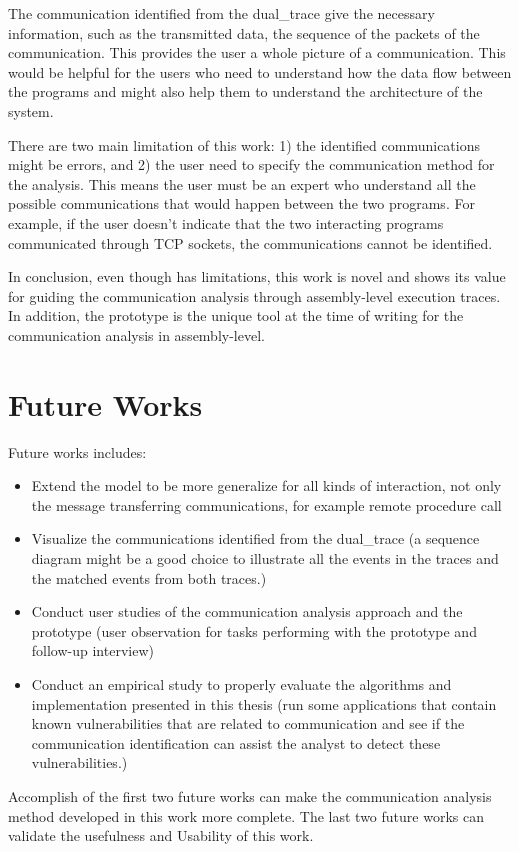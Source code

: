 The communication identified from the dual\_trace give the necessary information, such as the transmitted data, the sequence of the packets of the communication. This provides the user a whole picture of a communication. This would be helpful for the users who need to understand how the data flow between the programs and might also help them to understand the architecture of the system. 

There are two main limitation of this work: 1) the identified communications might be errors, and 2) the user need to specify the communication method for the analysis. This means the user must be an expert who understand all the possible communications that would happen between the two programs. For example, if the user doesn't indicate that the two interacting programs communicated through TCP sockets, the communications cannot be identified. 

In conclusion, even though has limitations, this work is novel and shows its value for guiding the communication analysis through assembly-level execution traces. In addition, the prototype is the unique tool at the time of writing for the communication analysis in assembly-level.

\section{Future Works}

Future works includes:
\begin{itemize}
\item Extend the model to be more generalize for all kinds of interaction, not only the message transferring communications, for example remote procedure call
\item Visualize the communications identified from the dual\_trace (a sequence diagram might be a good choice to illustrate all the events in the traces and the matched events from both traces.) 
\item Conduct user studies of the communication analysis approach and the prototype (user observation for tasks performing with the prototype and follow-up interview)
\item Conduct an empirical study to properly evaluate the algorithms and implementation presented in this thesis (run some applications that contain known vulnerabilities that are related to communication and see if the communication identification can assist the analyst to detect these vulnerabilities.)
\end{itemize}

Accomplish of the first two future works can make the communication analysis method developed in this work more complete. The last two future works can validate the usefulness and Usability of this work.


